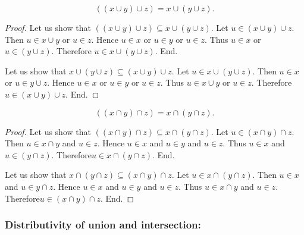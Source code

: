 \documentclass[../../set-theory.tex]{subfiles}
\begin{document}
  \begin{forthel}
    \begin{proposition}\label{SetTheory_01_01_665069}
      \[ ((x \cup y) \cup z) = x \cup (y \cup z). \]
    \end{proposition}
    \begin{proof}
      Let us show that $((x \cup y) \cup z) \subseteq x \cup (y \cup z)$.
        Let $u \in (x \cup y) \cup z$.
        Then $u \in x \cup y$ or $u \in z$.
        Hence $u \in x$ or $u \in y$ or $u \in z$.
        Thus $u \in x$ or $u \in (y \cup z)$.
        Therefore $u \in x \cup (y \cup z)$.
      End.

      Let us show that $x \cup (y \cup z) \subseteq (x \cup y) \cup z$.
        Let $u \in x \cup (y \cup z)$.
        Then $u \in x$ or $u \in y \cup z$.
        Hence $u \in x$ or $u \in y$ or $u \in z$.
        Thus $u \in x \cup y$ or $u \in z$.
        Therefore $u \in (x \cup y) \cup z$.
      End.
    \end{proof}

    \begin{proposition}\label{SetTheory_01_01_368359}
      \[ ((x \cap y) \cap z) = x \cap (y \cap z). \]
    \end{proposition}
    \begin{proof}
      Let us show that $((x \cap y) \cap z) \subseteq x \cap (y \cap z)$.
        Let $u \in (x \cap y) \cap z$.
        Then $u \in x \cap y$ and $u \in z$.
        Hence $u \in x$ and $u \in y$ and $u \in z$.
        Thus $u \in x$ and $u \in (y \cap z)$.
        Therefore$ u \in x \cap (y \cap z)$.
      End.

      Let us show that $x \cap (y \cap z) \subseteq (x \cap y) \cap z$.
        Let $u \in x \cap (y \cap z)$.
        Then $u \in x$ and $u \in y \cap z$.
        Hence $u \in x$ and $u \in y$ and $u \in z$.
        Thus $u \in x \cap y$ and $u \in z$.
        Therefore$ u \in (x \cap y) \cap z$.
      End.
    \end{proof}
  \end{forthel}


  \subsubsection*{Distributivity of union and intersection:}
\end{document}
